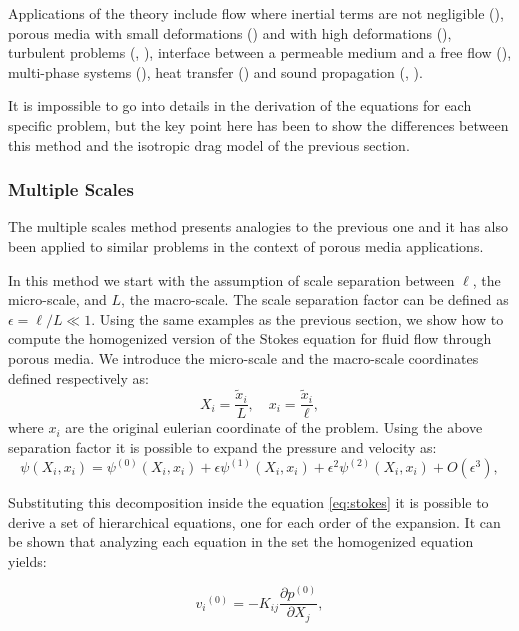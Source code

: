 Applications of the theory include flow where inertial terms are not negligible (\citet{whitaker1996forchheimer}), porous media with small deformations (\citet{whitaker1986flow2}) and with high deformations (\citet{hussong2011continuum}), turbulent problems (\citet{soulaine2014}, \citet{breugem2006influence}), interface between a permeable medium and a free flow (\citet{beavers1967boundary}), multi-phase systems (\citet{whitaker1973transport}), heat transfer (\citet{carbonell1984heat}) and sound propagation (\citet{firdaouss1998some}, \citet{lafarge1998sound}).

It is impossible to go into details in the derivation of the equations for each specific problem, but the key point here has been to show the differences between this method and the isotropic drag model of the previous section.

\subsubsection{Multiple Scales}

The multiple scales method presents analogies to the previous one and it has also been applied to similar problems in the context of porous media applications.

In this method we start with the assumption of scale separation between $\ell$, the micro-scale, and $L$, the macro-scale.
The scale separation factor can be defined as $\epsilon = \ell/L \ll 1$.
Using the same examples as the previous section, we show how to compute the homogenized version of the Stokes equation for fluid flow through porous media.
We introduce the micro-scale and the macro-scale coordinates defined respectively as:
$$
 X_i = \dfrac{\tilde{x}_i}{L}, \quad   x_i = \dfrac{\tilde{x}_i}{\ell},
$$
where $x_i$ are the original eulerian coordinate of the problem.
Using the above separation factor it is possible to expand the pressure and velocity as:
$$
\psi(X_i, x_i) = \psi^{(0)}(X_i, x_i)  +\epsilon \psi^{(1)}(X_i, x_i) +\epsilon^2 \psi^{(2)}(X_i, x_i) +O(\epsilon^3),
$$

Substituting this decomposition inside the equation \eqref{eq:stokes} it is possible to derive a set of hierarchical equations, one for each order of the expansion.
It can be shown that analyzing each equation in the set the homogenized equation yields:

\begin{equation}
{v_i}^{(0)} = -K_{ij} \dfrac{\partial p^{(0)}}{\partial X_j},
\label{eq:darcy_ms}
\end{equation} 

